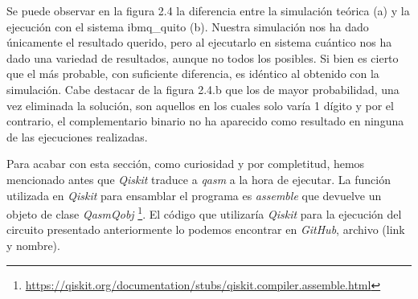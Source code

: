 Se puede observar en la figura 2.4 la diferencia entre la simulación teórica (a) y la ejecución con el sistema ibmq\_quito (b). Nuestra simulación nos ha dado únicamente el resultado querido, pero al ejecutarlo en sistema cuántico nos ha dado una variedad de resultados, aunque no todos los posibles. Si bien es cierto que el más probable, con suficiente diferencia, es idéntico al obtenido con la simulación. Cabe destacar de la figura 2.4.b que los de mayor probabilidad, una vez eliminada la solución, son aquellos en los cuales solo varía 1 dígito y por el contrario, el complementario binario no ha aparecido como resultado en ninguna de las ejecuciones realizadas. \newline

Para acabar con esta sección, como curiosidad y por completitud, hemos mencionado antes que \textit{Qiskit} traduce a \textit{qasm} a la hora de ejecutar. La función utilizada en \textit{Qiskit} para ensamblar el programa es \textit{assemble} que devuelve un objeto de clase \textit{QasmQobj} \footnote{\url{https://qiskit.org/documentation/stubs/qiskit.compiler.assemble.html}}. El código que utilizaría \textit{Qiskit} para la ejecución del circuito presentado anteriormente lo podemos encontrar en \textit{GitHub}, archivo (link y nombre).\newline

